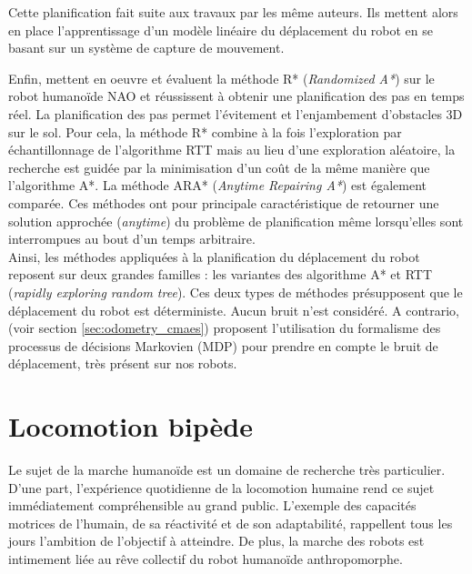 Cette planification fait suite aux travaux \cite{schmitz_learning_2010} par
les même auteurs. Ils mettent alors en place l'apprentissage d'un
modèle linéaire du déplacement du robot en se basant sur un système de capture de mouvement.

Enfin, \cite{hornung_search-based_2013} mettent en oeuvre et évaluent 
la méthode R* (\textit{Randomized A*}) sur le robot humanoïde NAO
et réussissent à obtenir une planification des pas en temps réel.
La planification des pas permet l'évitement et l'enjambement d'obstacles 
3D sur le sol.
Pour cela, la méthode R* combine à la fois l'exploration par échantillonnage
de l'algorithme RTT mais au lieu d'une exploration aléatoire, la recherche
est guidée par la minimisation d'un coût de la même manière que l'algorithme A*. 
La méthode ARA* (\textit{Anytime Repairing A*}) est également comparée. 
Ces méthodes ont pour principale caractéristique de retourner une solution
approchée (\textit{anytime}) du problème de planification même 
lorsqu'elles sont interrompues au bout d'un temps arbitraire.\\

Ainsi, les méthodes appliquées à la planification du déplacement du robot
reposent sur deux grandes familles : 
les variantes des algorithme A* et RTT (\textit{rapidly exploring random tree}).
Ces deux types de méthodes présupposent que le déplacement du robot
est déterministe. Aucun bruit n'est considéré.
A contrario, \cite{ApproachICAPS2017} (voir section \ref{sec:odometry_cmaes}) proposent 
l'utilisation du formalisme des processus de décisions Markovien (MDP)
pour prendre en compte le bruit de déplacement, très présent sur nos robots.

\section{Locomotion bipède\label{sec:biblio_walk}}

Le sujet de la marche humanoïde
est un domaine de recherche très particulier.
D'une part, l'expérience quotidienne de la locomotion
humaine rend ce sujet immédiatement compréhensible
au grand public. 
L'exemple des capacités motrices de l'humain, de sa réactivité et
de son adaptabilité, rappellent tous les jours 
l'ambition de l'objectif à atteindre.
De plus, la marche des robots est intimement liée au rêve
collectif du robot humanoïde anthropomorphe.

